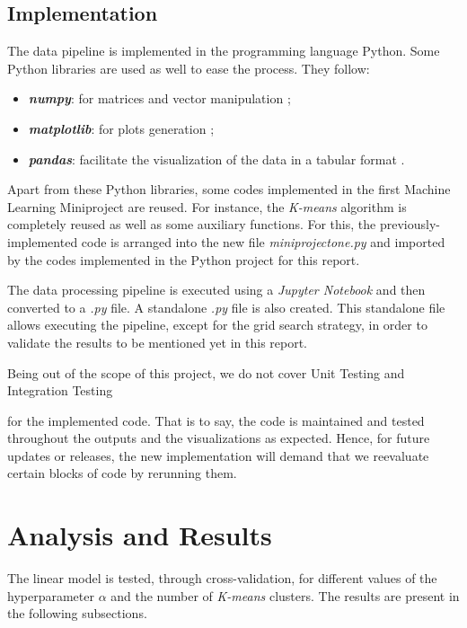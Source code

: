\documentclass{article}
\begin{document}
\subsection{Implementation}

The data pipeline is implemented in the programming language Python. Some Python libraries are used as well to ease the process. They follow:

\begin{itemize}
    \item \textbf{\textit{numpy}}: for matrices and vector manipulation \parencite{ numpydot, numpyidentity, numpylinalgpinv};
    \item \textbf{\textit{matplotlib}}: for plots generation \parencite{matplotlibplot};
    \item \textbf{\textit{pandas}}: facilitate the visualization of the data in a tabular format \parencite{pandasdataframe}.

\end{itemize}

Apart from these Python libraries, some codes implemented in the first Machine Learning Miniproject are reused. For instance, the \textit{K-means} algorithm is completely reused as well as some auxiliary functions. For this, the previously-implemented code is arranged into the new file \textit{miniprojectone.py} and imported by the codes implemented in the Python project for this report.

The data processing pipeline is executed using a \textit{Jupyter Notebook} and then converted to a \textit{.py} file. A standalone \textit{.py} file is also created. This standalone file allows executing the pipeline, except for the grid search strategy, in order to validate the results to be mentioned yet in this report.

Being out of the scope of this project, we do not cover Unit Testing and Integration Testing\usepackage{} for the implemented code. That is to say, the code is maintained and tested throughout the outputs and the visualizations as expected. Hence,  for future updates or releases, the new implementation will demand that we reevaluate certain blocks of code by rerunning them.

\section{Analysis and Results}

The linear model is tested, through cross-validation, for different values of the hyperparameter $\alpha$ and the number of \textit{K-means} clusters. The results are present in the following subsections.
\end{document}
